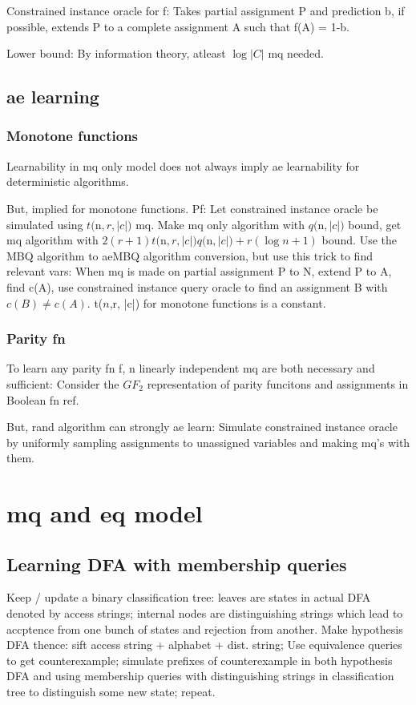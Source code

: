 \documentclass[oneside, article]{memoir}
\begin{document}
Constrained instance oracle for f: Takes partial assignment P and prediction b, if possible, extends P to a complete assignment A such that f(A) = 1-b.

Lower bound: By information theory, atleast $\log |C|$ mq needed.

\subsection{ae learning}
\subsubsection{Monotone functions}
Learnability in mq only model does not always imply ae learnability for deterministic algorithms.

But, implied for monotone functions. Pf: Let constrained instance oracle be simulated using $t($n$,r, |c|)$ mq. Make mq only algorithm with $q($n$, |c|)$ bound, get mq algorithm with $2(r+1)t($n$,r, |c|)q($n$, |c|)+r(\log n +1)$ bound. Use the MBQ algorithm to aeMBQ algorithm conversion, but use this trick to find relevant vars: When mq is made on partial assignment P to N, extend P to A, find c(A), use constrained instance query oracle to find an assignment B with $c(B) \neq c(A)$. t($n$,r, |c|) for monotone functions is a constant.

\subsubsection{Parity fn}
To learn any parity fn f, n linearly independent mq are both necessary and sufficient: Consider the $GF_2$ representation of parity funcitons and assignments in Boolean fn ref.

But, rand algorithm can strongly ae learn: Simulate constrained instance oracle by uniformly sampling assignments to unassigned variables and making mq's with them.

\section{mq and eq model}
\subsection{Learning DFA with membership queries}
Keep / update a binary classification tree: leaves are states in actual DFA denoted by access strings; internal nodes are distinguishing strings which lead to accptence from one bunch of states and rejection from another. Make hypothesis DFA thence: sift access string + alphabet + dist. string; Use equivalence queries to get counterexample; simulate prefixes of counterexample in both hypothesis DFA and using membership queries with distinguishing strings in classification tree to distinguish some new state; repeat.
\end{document}
